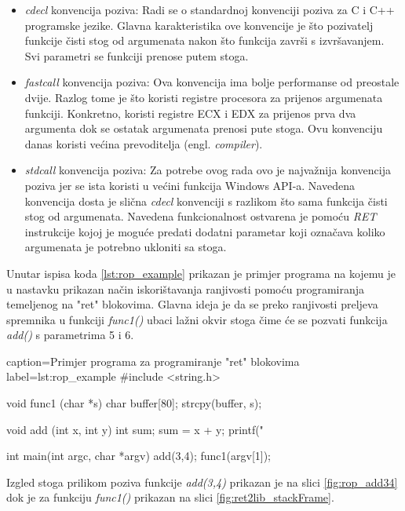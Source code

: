 \documentclass[times, utf8, diplomski, numeric]{fer}
\begin{document}
\begin{itemize}

\item \emph{cdecl} konvencija poziva: Radi se o standardnoj
konvenciji poziva za C i C++ programske jezike. Glavna
karakteristika ove konvencije je što pozivatelj funkcije čisti
stog od argumenata nakon što funkcija završi s izvršavanjem. Svi
parametri se funkciji prenose putem stoga.

\item \emph{fastcall} konvencija poziva: Ova konvencija ima bolje
performanse od preostale dvije. Razlog tome je što koristi
registre procesora za prijenos argumenata funkciji. Konkretno,
koristi registre ECX i EDX za prijenos prva dva argumenta dok se
ostatak argumenata prenosi pute stoga. Ovu konvenciju danas
koristi većina prevoditelja (engl. \emph{compiler}).

\item \emph{stdcall} konvencija poziva: Za potrebe ovog rada ovo
je najvažnija konvencija poziva jer se ista koristi u većini
funkcija Windows API-a. Navedena konvencija dosta je slična
\emph{cdecl} konvenciji s razlikom što sama funkcija čisti stog
od argumenata. Navedena funkcionalnost ostvarena je pomoću
\emph{RET} instrukcije kojoj je moguće predati dodatni parametar
koji označava koliko argumenata je potrebno ukloniti sa stoga.
\end{itemize}

Unutar ispisa koda \ref{lst:rop_example} prikazan je primjer
programa na kojemu je u nastavku prikazan način iskorištavanja
ranjivosti pomoću programiranja temeljenog na "ret" blokovima.
Glavna ideja je da se preko ranjivosti preljeva spremnika u
funkciji \emph{func1()} ubaci lažni okvir stoga čime će se
pozvati funkcija \emph{add()} s parametrima 5 i 6.
 
\begin{ispis} {caption=Primjer programa za programiranje "ret" blokovima} {label=lst:rop_example}
#include <string.h>
 
void func1 (char *s) { char buffer[80]; strcpy(buffer, s); }

void add (int x, int y)
{
	int sum;
	sum = x + y;
	printf("%
}

int main(int argc, char *argv)
{
	add(3,4);
	func1(argv[1]);
}
\end{ispis}

Izgled stoga prilikom poziva funkcije \emph{add(3,4)} prikazan je na slici \ref{fig:rop_add34} dok je za funkciju \emph{func1()} prikazan na slici \ref{fig:ret2lib_stackFrame}.
\end{document}
